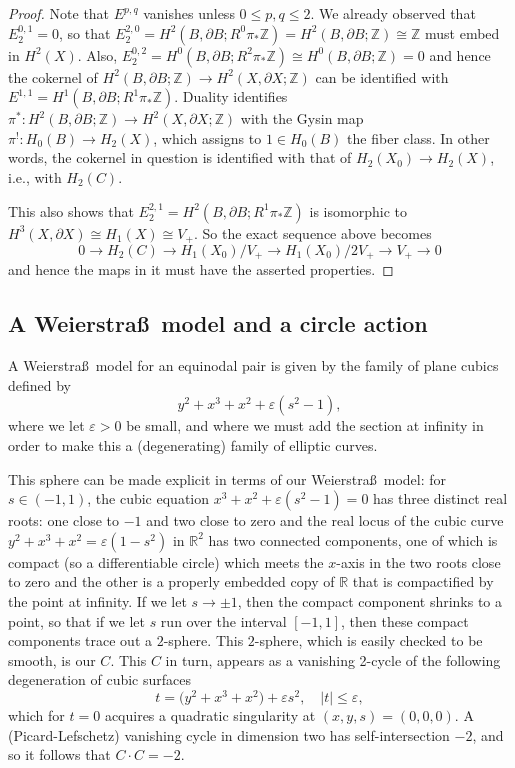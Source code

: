\documentclass[10pt,letterpaper]{amsart}
\numberwithin{equation}{section}
\def\RR{{\mathbb R}}
\def\ZZ{{\mathbb Z}}
\newcommand{\eps}{\varepsilon}
\newcommand{\p}{\partial}
\theoremstyle{remark}
\begin{document}
\begin{proof}
Note that  $E^{p,q}$ vanishes  unless $0\le p, q\le 2$. We already observed  that $E_2^{0,1}=0$, so that  $E_2^{2,0}=
H^2(B, \p B; R^0\pi_*\ZZ)=H^2(B, \p B; \ZZ)\cong \ZZ$ must embed in $H^2(X)$. Also,  $E_2^{0,2}=
H^0(B, \p B; R^2\pi_*\ZZ)\cong H^0(B, \p B; \ZZ)=0$ and hence the cokernel  of $H^2(B, \p B; \ZZ)\to H^2(X, \p X; \ZZ)$ 
can be identified with $E^{1,1}=H^1(B, \p B; R^1\pi_*\ZZ)$. Duality identifies  $\pi^*: H^2(B, \p B; \ZZ)\to H^2(X, \p X; \ZZ)$ with
the Gysin map $\pi^!: H_0(B)\to H_2(X)$, which assigns to $1\in H_0(B)$ the fiber class. In other words, the  cokernel in question is identified with that of $H_2(X_0)\to H_2(X)$, i.e., with $H_2(C)$.

This also shows that $E_2^{2,1}=H^2(B, \p B;R^1\pi_*\ZZ)$ is isomorphic to $H^3(X, \p X)\cong H_1(X)\cong V_+$. So the exact sequence above becomes
\[
0\to H_2(C)\to H_1(X_0)/V_+\to H_1(X_0)/ 2 V_+\to V_+\to 0
\]
and hence the maps in it must have the asserted properties. 
\end{proof}

\subsection{A Weierstra\ss\ model and a circle action}\label{subsect:weierstrass}
A  Weierstra\ss\ model for an equinodal pair is given by the family  of plane cubics defined by
\[
y^2+x^3+x^2 +\eps  (s^2-1), 
\] 
where we let $\eps>0 $ be small, and where we must add the section at infinity in order to  make this a (degenerating) family of elliptic curves. 

This sphere can be made explicit in terms of our Weierstra\ss\ model: for $s\in (-1,1)$, the
cubic equation $x^3+x^2 +\eps  (s^2-1)=0$ has three distinct real roots: one close to $-1$ and two close to zero and 
the real locus of the cubic curve  $y^2+x^3+x^2 =\eps  (1-s^2)$ in $\RR^2$ has two connected components, one of which is compact (so a differentiable circle) which meets the $x$-axis in the two roots close to zero  and the other is a properly embedded copy of $\RR$  that is compactified by the point at  infinity. If we let $s\to \pm 1$, then the compact component  shrinks to a point, so that if we let $s$ run over the interval $[-1,1]$, then these compact components trace out a $2$-sphere. This
$2$-sphere, which is easily checked to be smooth,  is our $C$. This $C$ in turn, appears as a vanishing 2-cycle of the  following degeneration of cubic surfaces 
\[
t=\big(y^2+x^3+x^2) +\eps  s^2,\quad  |t|\le \eps, 
\]
which for $t=0$  acquires a quadratic singularity at $(x,y,s)=(0,0,0)$. A (Picard-Lefschetz) vanishing cycle in dimension two has self-intersection $-2$, and so it follows that $C\cdot C=-2$.
\end{document}
